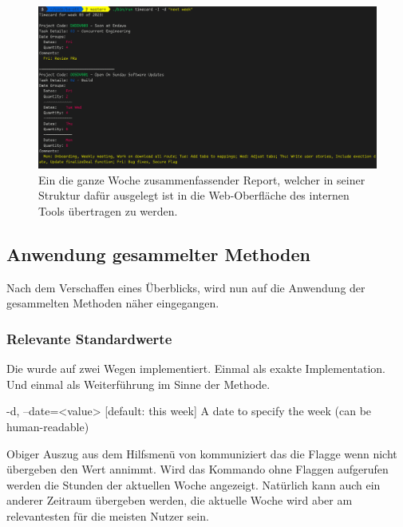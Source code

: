 \documentclass[oneside,bibliography=totocnumbered,BCOR=5mm]{scrbook}
\newenvironment{code}{\captionsetup{type=listing, skip=0pt}}{}
\begin{document}
\begin{figure}
  \centering
  \includegraphics[scale=0.5]{timecard-real.png}
  \caption{Ein die ganze Woche zusammenfassender Report, welcher in seiner Struktur dafür ausgelegt ist in die Web-Oberfläche des internen Tools übertragen zu werden.}
  \label{fig:timecard}
\end{figure}

\subsection{Anwendung gesammelter Methoden}

Nach dem Verschaffen eines Überblicks, wird nun auf die Anwendung der
gesammelten Methoden näher eingegangen.

\subsubsection{Relevante Standardwerte}


Die  wurde auf zwei Wegen implementiert. Einmal als
exakte Implementation. Und einmal als Weiterführung im Sinne der Methode.

\begin{code}
  \begin{shellcode}
-d, --date=<value>  [default: this week] A date to specify the week (can be human-readable)
  \end{shellcode}
  \medskip
\end{code}

Obiger Auszug aus dem Hilfsmenü von  kommuniziert das
die  Flagge wenn nicht übergeben den Wert  annimmt. Wird das Kommando  ohne Flaggen aufgerufen
werden die Stunden der aktuellen Woche angezeigt. Natürlich kann auch ein
anderer Zeitraum übergeben werden, die aktuelle Woche wird aber am relevantesten
für die meisten Nutzer sein.
\end{document}
